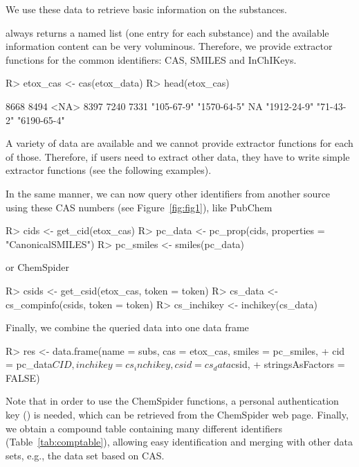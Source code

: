 \documentclass[article]{jss}
\begin{document}
We use these data to retrieve basic information on the substances.
%
\begin{CodeChunk}
\end{CodeChunk}
%
 always returns a named list (one entry for each substance) and the available information content can be very voluminous.
Therefore, we provide extractor functions for the common identifiers: CAS, SMILES and InChIKeys.
%
\begin{CodeChunk}
\begin{CodeInput}
R> etox_cas <- cas(etox_data)
R> head(etox_cas)
\end{CodeInput}
\begin{CodeOutput}
       8668        8494        <NA>        8397        7240        7331 
 "105-67-9" "1570-64-5"          NA "1912-24-9"   "71-43-2" "6190-65-4" 
\end{CodeOutput}
\end{CodeChunk}
%
A variety of data are available and we cannot provide extractor
functions for each of those.  Therefore, if users need to extract
other data, they have to write simple extractor functions (see the
following examples).

In the same manner, we can now query other identifiers from another
source using these CAS numbers (see Figure~\ref{fig:fig1}), like
PubChem
%
\begin{CodeChunk}
\begin{CodeInput}
R> cids <- get_cid(etox_cas)
R> pc_data <- pc_prop(cids, properties = "CanonicalSMILES")
R> pc_smiles <- smiles(pc_data)
\end{CodeInput}
\end{CodeChunk}
%
or ChemSpider
%
\begin{CodeChunk}
\begin{CodeInput}
R> csids <- get_csid(etox_cas, token = token)
R> cs_data <- cs_compinfo(csids, token = token)
R> cs_inchikey <- inchikey(cs_data)
\end{CodeInput}
\end{CodeChunk}
%
Finally, we combine the queried data into one data frame
%
\begin{CodeChunk}
\begin{CodeInput}
R> res <- data.frame(name = subs, cas = etox_cas, smiles = pc_smiles, 
+    cid = pc_data$CID, inchikey = cs_inchikey, csid = cs_data$csid, 
+    stringsAsFactors = FALSE)
\end{CodeInput}
\end{CodeChunk}
%
Note that in order to use the ChemSpider functions, a personal
authentication key () is needed, which can be retrieved
from the ChemSpider web page.  Finally, we obtain a compound table
containing many different identifiers (Table~\ref{tab:comptable}),
allowing easy identification and merging with other data sets, e.g.,
the  data set based on CAS.
\end{document}
